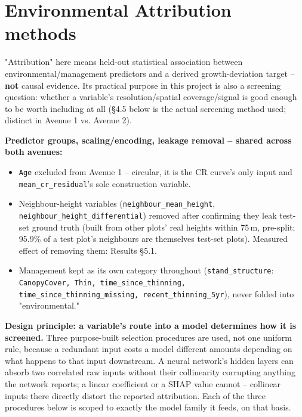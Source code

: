 \section{Environmental Attribution methods}

"Attribution" here means held-out statistical association between environmental/management
predictors and a derived growth-deviation target -- \textbf{not} causal evidence. Its practical
purpose in this project is also a screening question: whether a variable's resolution/spatial
coverage/signal is good enough to be worth including at all (\S4.5 below is the actual screening
method used; distinct in Avenue 1 vs. Avenue 2).

\textbf{Predictor groups, scaling/encoding, leakage removal -- shared across both avenues:}
\begin{itemize}
\setlength\itemsep{0pt}
\item \texttt{Age} excluded from Avenue 1 -- circular, it is the CR curve's only input and
\texttt{mean\_cr\_residual}'s sole construction variable.
\item Neighbour-height variables (\texttt{neighbour\_mean\_height},
\texttt{neighbour\_height\_differential}) removed after confirming they leak test-set ground truth
(built from other plots' real heights within 75\,m, pre-split; 95.9\% of a test plot's neighbours
are themselves test-set plots). Measured effect of removing them: Results \S5.1.
\item Management kept as its own category throughout
(\texttt{stand\_structure}: \texttt{CanopyCover, Thin, time\_since\_thinning,
time\_since\_thinning\_missing, recent\_thinning\_5yr}), never folded into "environmental."
\end{itemize}

\textbf{Design principle: a variable's route into a model determines how it is screened.} Three
purpose-built selection procedures are used, not one uniform rule, because a redundant input
costs a model different amounts depending on what happens to that input downstream. A neural
network's hidden layers can absorb two correlated raw inputs without their collinearity
corrupting anything the network reports; a linear coefficient or a SHAP value cannot -- collinear
inputs there directly distort the reported attribution. Each of the three procedures below is
scoped to exactly the model family it feeds, on that basis.

